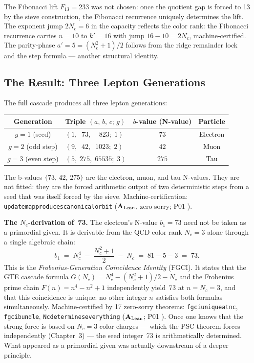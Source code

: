 \documentclass[11pt,openany]{book}
\theoremstyle{remark}
\newcommand{\lean}[1]{%
  \penalty-100
  \begingroup\def\_{\textunderscore\allowbreak}\texttt{#1}\endgroup}
\newcommand{\Nc}{N_c}
\newcommand{\CatAL}{\ensuremath{\textbf{A}_{\rm Lean}}}
\begin{document}
The Fibonacci lift $F_{13} = 233$ was not chosen: once the quotient gap is forced to 13
by the sieve construction, the Fibonacci recurrence uniquely determines the lift.
The exponent jump $2\Nc = 6$ in the capacity reflects the color rank: the Fibonacci
recurrence carries $n = 10$ to $k' = 16$ with jump $16 - 10 = 2\Nc$, machine-certified.
The parity-phase $a' = 5 = (\Nc^2 + 1)/2$ follows from the ridge remainder lock and
the step formula --- another structural identity.

\subsection{The Result: Three Lepton Generations}
\label{sec:gte_cascade_result}

The full cascade produces all three lepton generations:

\begin{tcolorbox}[colback=orange!5,colframe=orange!60,
  title={Result: Lepton Cascade from the GTE Map (\CatAL)},breakable]
\begin{center}
\renewcommand{\arraystretch}{1.35}
\begin{tabular}{@{}clcc@{}}
\toprule
Generation & Triple $(a,\,b,\,c;\,g)$ & $b$-value (N-value) & Particle \\
\midrule
$g = 1$ (seed)      & $(1,\;\;73,\;\;\;\;823;\;1)$ & $73$  & Electron \\
$g = 2$ (odd step)  & $(9,\;\;42,\;\;1023;\;2)$    & $42$  & Muon     \\
$g = 3$ (even step) & $(5,\;275,\;65535;\;3)$       & $275$ & Tau      \\
\bottomrule
\end{tabular}
\end{center}
The b-values $\{73,\,42,\,275\}$ are the electron, muon, and tau N-values.
They are not fitted: they are the forced arithmetic output of two deterministic steps
from a seed that was itself forced by the sieve.
Machine-certification: \lean{update\_map\_produces\_canonical\_orbit} (\CatAL, zero sorry; P01 \cite{SpivackSM}).
\end{tcolorbox}

\noindent\textbf{The $N_c$-derivation of~73.}\enspace
The electron's N-value $b_1 = 73$ need not be taken as a primordial given.
It is derivable from the QCD color rank $\Nc = 3$ alone through a single algebraic chain:
\[
  b_1 \;=\; \Nc^4 \;-\; \frac{\Nc^2 + 1}{2} \;-\; \Nc
       \;=\; 81 - 5 - 3 \;=\; 73.
\]
This is the \emph{Frobenius-Generation Coincidence Identity} (FGCI).
It states that the GTE cascade formula $G(\Nc) = \Nc^4 - (\Nc^2+1)/2 - \Nc$ and the
Frobenius prime chain $F(n) = n^4 - n^2 + 1$ independently yield~73 at $n = \Nc = 3$,
and that this coincidence is unique: no other integer $n$ satisfies both formulas
simultaneously.
Machine-certified by 17 zero-sorry theorems:
\lean{fgci\_unique\_at\_nc}, \lean{fgci\_bundle}, \lean{N\_c\_determines\_everything}
(\CatAL; P01 \cite{SpivackSM}).
Once one knows that the strong force is based on $\Nc = 3$ color charges ---
which the PSC theorem forces independently (Chapter~3) ---
the seed integer~73 is arithmetically determined.
What appeared as a primordial given was actually downstream of a deeper principle.
\end{document}
